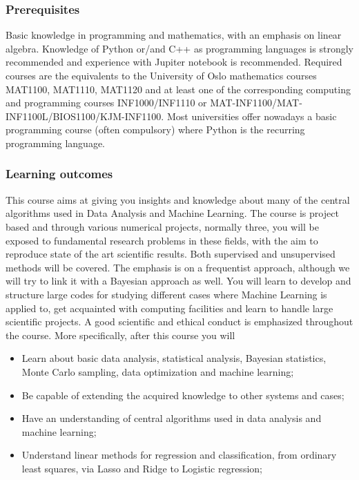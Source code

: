 \documentclass{beamer}
\begin{document}
\begin{frame}
\frametitle{Prerequisites}

Basic knowledge in programming and mathematics, with an emphasis on
linear algebra. Knowledge of Python or/and C++ as programming
languages is strongly recommended and experience with Jupiter notebook
is recommended. Required courses are the equivalents to the University
of Oslo mathematics courses MAT1100, MAT1110, MAT1120 and at least one
of the corresponding computing and programming courses INF1000/INF1110
or MAT-INF1100/MAT-INF1100L/BIOS1100/KJM-INF1100. Most universities
offer nowadays a basic programming course (often compulsory) where
Python is the recurring programming language.
\end{frame}

\begin{frame}
\frametitle{Learning outcomes}

\begin{block}{}

This course aims at giving you insights and knowledge about many of
the central algorithms used in Data Analysis and Machine Learning.
The course is project based and through various numerical projects,
normally three, you will be exposed to fundamental research problems
in these fields, with the aim to reproduce state of the art scientific
results. Both supervised and unsupervised methods will be covered. The
emphasis is on a frequentist approach, although we will try to link it
with a Bayesian approach as well. You will learn to develop and
structure large codes for studying different cases where Machine
Learning is applied to, get acquainted with computing facilities and
learn to handle large scientific projects. A good scientific and
ethical conduct is emphasized throughout the course. More
specifically, after this course you will

\begin{itemize}
\item Learn about basic data analysis, statistical analysis, Bayesian statistics, Monte Carlo sampling, data optimization and machine learning;

\item Be capable of extending the acquired knowledge to other systems and cases;

\item Have an understanding of central algorithms used in data analysis and machine learning;

\item Understand linear methods for regression and classification, from ordinary least squares, via Lasso and Ridge to Logistic regression;


\end{itemize}
\end{block}
\end{frame}
\end{document}
